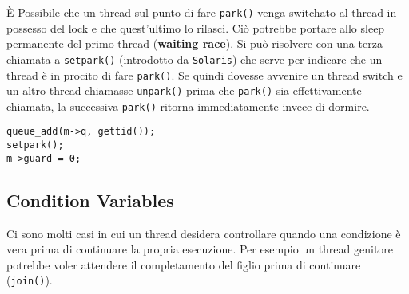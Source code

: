 \documentclass[12pt, letterpaper]{article}
\begin{document}
				È Possibile che un thread sul punto di fare \texttt{park()}	venga switchato al thread in possesso del lock e che quest'ultimo lo rilasci. Ciò potrebbe portare allo sleep permanente del primo thread (\textbf{waiting race}). Si può risolvere con una terza chiamata a \texttt{setpark()} (introdotto da \texttt{Solaris}) che serve per indicare che un thread è in procito di fare \texttt{park()}. Se quindi dovesse avvenire un thread switch e un altro thread chiamasse \texttt{unpark()} prima che \texttt{park()} sia effettivamente chiamata, la successiva \texttt{park()} ritorna immediatamente invece di dormire.
				
				\begin{lstlisting}[style=CStyle]
queue_add(m->q, gettid());
setpark();
m->guard = 0;	\end{lstlisting} 
		
		\subsection{Condition Variables}
			Ci sono molti casi in cui un thread desidera controllare quando una condizione è vera prima di continuare la propria esecuzione. Per esempio un thread genitore potrebbe voler attendere il completamento del figlio prima di continuare (\texttt{join()}).
			
\end{document}
